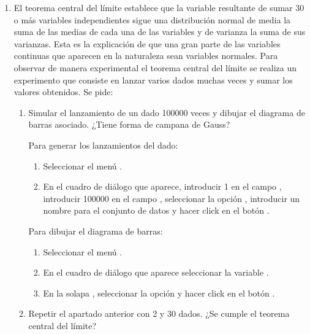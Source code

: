 \begin{enumerate}[leftmargin=*]
\item El teorema central del límite establece que la variable resultante de sumar 30 o más variables independientes
sigue una distribución normal de media la suma de las medias de cada una de las variables y de varianza la suma de sus
varianzas.
Esta es la explicación de que una gran parte de las variables continuas que aparecen en la naturaleza sean variables
normales.
Para observar de manera experimental el teorema central del límite se realiza un experimento que consiste en lanzar
varios dados muchas veces y sumar los valores obtenidos. 
Se pide:
\begin{enumerate}
\item Simular el lanzamiento de un dado 100000 veces y dibujar el diagrama de barras asociado. 
¿Tiene forma de campana de Gauss?
\begin{indicacion}Para generar los lanzamientos del dado: 
\begin{enumerate}
\item Seleccionar el menú .
\item En el cuadro de diálogo que aparece, introducir 1 en el campo , introducir 100000 en el
campo , seleccionar la opción , introducir un nombre para el conjunto
de datos y hacer click en el botón .
\end{enumerate}
Para dibujar el diagrama de barras:
\begin{enumerate}
\item Seleccionar el menú .
\item En el cuadro de diálogo que aparece seleccionar la variable .
\item En la solapa , seleccionar la opción  y hacer click en
el botón .
\end{enumerate}
\end{indicacion}

\item Repetir el apartado anterior con 2 y 30 dados. 
¿Se cumple el teorema central del límite?
\end{enumerate}



\end{enumerate}
